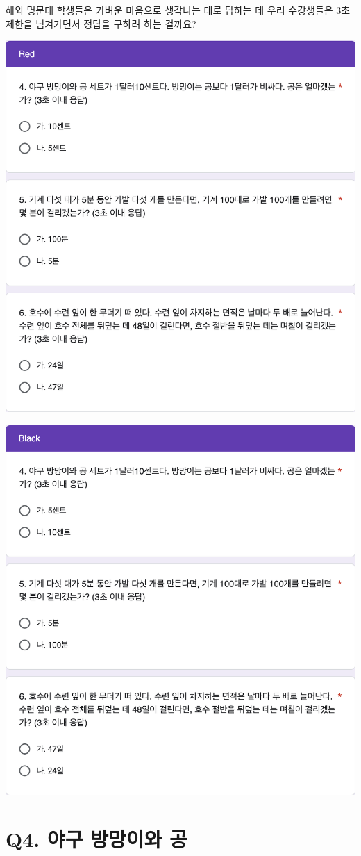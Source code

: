 \documentclass[
]{book}
\begin{document}
해외 명문대 학생들은 가벼운 마음으로 생각나는 대로 답하는 데 우리 수강생들은 3초 제한을 넘겨가면서 정답을 구하려 하는 걸까요?

\begin{flushleft}\includegraphics[width=0.67\linewidth]{./pics/Quiz240419_Q4-6_Red} \end{flushleft}

\begin{flushleft}\includegraphics[width=0.67\linewidth]{./pics/Quiz240419_Q4-6_Black} \end{flushleft}

\section{Q4. 야구 방망이와 공}\label{q4.-uxc57cuxad6c-uxbc29uxb9dduxc774uxc640-uxacf5}
\end{document}
